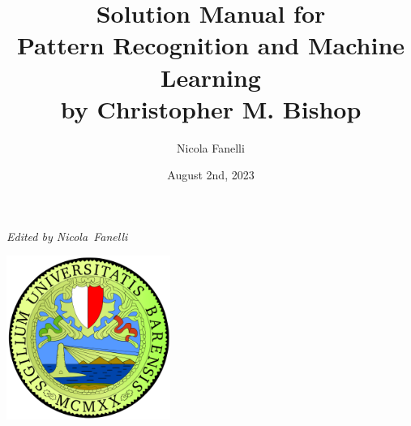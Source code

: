 \documentclass[12pt]{article}
\title{Solution Manual for\\Pattern Recognition and Machine Learning\\by Christopher M. Bishop}
\author{Nicola Fanelli}
\date{August 2nd, 2023}
\begin{document}
\begin{titlepage}
    \centering
    \vspace*{1cm}
    
    \Huge\textbf{\thetitle}
    
    \vspace{0.5cm}
    \Large\textit{Edited by Nicola~Fanelli}
    
    \vfill
    
    \vspace{0.8cm}
    
    \includegraphics[width=0.4\textwidth]{uniba-logo.png} %
    
    \vspace{1cm}
    
    \Large\thedate
    
\end{titlepage}

\newpage



\end{document}
